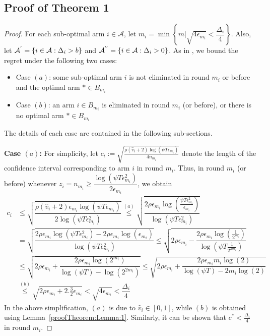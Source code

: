 \subsection*{Proof of Theorem 1}
\label{sec:proofTheorem:Theorem1}
\begin{proof}
For each sub-optimal arm ${i}\in\mathcal{A}$, let $m_{i}=\min{\left\lbrace m|\sqrt{4\epsilon_{m_i}} < \dfrac{\Delta_{i}}{4}\right\rbrace}$. Also, let $\mathcal{A}^{'}=\lbrace i\in \mathcal{A}: \Delta_{i} > b \rbrace$ and $\mathcal{A}^{''}=\lbrace i\in \mathcal{A}: \Delta_{i} > 0 \rbrace$. As in \cite{auer2010ucb}, we bound the regret under the following two cases: 
\begin{itemize}
\item {Case $(a)$}: some sub-optimal arm ${i}$ is not eliminated in round $m_{i}$ or before and the optimal arm ${*}\in B_{m_{i}}$
\item {Case $(b)$}: an arm ${i}\in B_{m_i}$ is eliminated in round $m_{i}$ (or before), or there is no optimal arm $*\in B_{m_i}$
\end{itemize} 
The details of each case are contained in the following sub-sections.


\textbf{Case $(a)$:}
For simplicity, let $c_{i} := \sqrt{\frac{\rho (\hat{v}_i + 2) \log (\psi T\epsilon_{m_{i}})}{4 n_{m_i}}}$ denote the length of the confidence interval corresponding to arm $i$ in round $m_i$. Thus, in round $m_i$ (or before) whenever $z_i = n_{m_{i}}\ge\dfrac{\log{(\psi T\epsilon_{m_{i}}^{2})}}{2\epsilon_{m_{i}}}$, we obtain
\begin{align*}
	c_{i} &\leq \sqrt{\dfrac{\rho (\hat{v}_i + 2)\epsilon_{m_{i}}\log (\psi T\epsilon_{m_{i}})}{2\log(\psi T\epsilon_{m_{i}}^{2})}} \overset{(a)}{\leq} \sqrt{\dfrac{2\rho\epsilon_{m_{i}}\log (\frac{\psi T\epsilon_{m_{i}}^{2}}{\epsilon_{m_{i}}})}{\log(\psi T\epsilon_{m_{i}}^{2})}} \\
	& = \sqrt{\dfrac{2\rho\epsilon_{m_{i}}\log (\psi T\epsilon_{m_{i}}^{2}) - 2\rho\epsilon_{m_{i}}\log (\epsilon_{m_{i}})}{\log(\psi T\epsilon_{m_{i}}^{2})}} 
	\leq  \sqrt{2\rho\epsilon_{m_{i}} - \dfrac{2\rho\epsilon_{m_i}\log(\frac{1}{2^{m_i}})}{\log(\psi T \frac{1}{2^{2m_i}})}} \\
	&\leq \sqrt{2\rho\epsilon_{m_{i}} + \dfrac{2\rho\epsilon_{m_i}\log(2^{m_i})}{\log(\psi T) - \log( 2^{2m_i})}}  \leq \sqrt{2\rho\epsilon_{m_{i}} + \dfrac{2\rho\epsilon_{m_i}m_i \log(2)}{\log(\psi T) - 2m_i\log( 2)}} \\ 
	 & \overset{(b)}{\leq} \sqrt{2\rho\epsilon_{m_{i}} + 2.\frac{3}{2}\epsilon_{m_i}} 
	  < \sqrt{4\epsilon_{m_i}} 
	  < \dfrac{\Delta_{i}}{4} 
	\end{align*}
In the above simplification, $(a)$ is due to $\hat{v}_i \in [0,1]$, while $(b)$ is obtained using Lemma~\ref{proofTheorem:Lemma:1}. Similarly, it can be shown that $c^* < \frac{\Delta_i}{4}$ in round $m_i$.


\end{proof}

